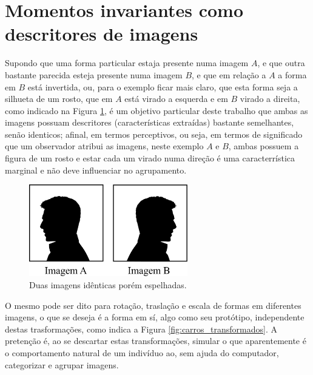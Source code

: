 \section{Momentos invariantes como descritores de imagens}\label{sec:momentos_desc}

Supondo que uma forma particular estaja presente numa imagem $ A $, e que outra
bastante parecida esteja presente numa imagem $ B $, e que em relação a $ A $ a forma
em $ B $ está invertida, ou, para o exemplo ficar mais claro, que esta forma seja a
silhueta de um rosto, que em $ A $ está virado a esquerda e em $ B $ virado a direita,
como indicado na Figura \ref{fig:rostos}, é um objetivo particular deste trabalho que ambas
as imagens possuam descritores (características extraídas) bastante semelhantes,
senão identicos; afinal, em termos perceptivos, ou seja, em termos de significado
que um observador atribui as imagens, neste exemplo $ A $ e $ B $, ambas possuem a
figura de um rosto e estar cada um virado numa direção é uma caracterrística
marginal e não deve influenciar no agrupamento.

\begin{figure}[H]
  \begin{center}
    \includegraphics[height=4cm]{imagens/rostos.pdf}
  \end{center}
  \caption{ Duas imagens idênticas porém espelhadas.  }
  \label{fig:rostos}
\end{figure}

O mesmo pode ser dito para rotação, traslação e escala de formas em diferentes
imagens, o que se deseja é a forma em sí, algo como seu protótipo, independente
destas trasformações, como indica a Figura \ref{fig:carros_transformados}.
A pretenção é, ao se descartar estas transformações,
simular o que aparentemente é o comportamento natural de um indivíduo ao, sem
ajuda do computador, categorizar e agrupar imagens.

